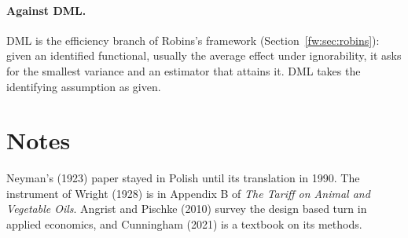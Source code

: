 \paragraph{Against DML.} DML is the efficiency branch of Robins's framework (Section~\ref{fw:sec:robins}): given an identified functional, usually the average effect under ignorability, it asks for the smallest variance and an estimator that attains it. DML takes the identifying assumption as given. 

\section*{Notes}

Neyman's (1923) paper stayed in Polish until its translation in 1990. The instrument of Wright (1928) is in Appendix B of \emph{The Tariff on Animal and Vegetable Oils}. Angrist and Pischke (2010) survey the design based turn in applied economics, and Cunningham (2021) is a textbook on its methods.

